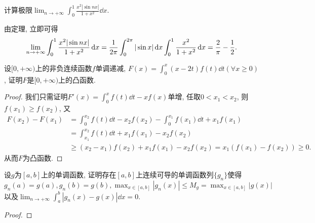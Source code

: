 \begin{quiza}
\woe 计算极限\(\lim_{n\rightarrow +\infty}\int_{0}^{1}\frac{x^2|\sin nx|}{1+x^2}\dd x.\)
\begin{solution}
由定理, 立即可得\[\lim_{n\rightarrow +\infty}\int_{0}^{1}\frac{x^2|\sin nx|}{1+x^2}\,\mathrm{d} x=\frac{1}{2\pi}\int_{0}^{2\pi}|\sin x|\,\mathrm{d} x\int_{0}^{1}\frac{x^2}{1+x^2}\,\mathrm{d} x=\frac{2}{\pi}-\frac{1}{2}.\qedhere\]
\end{solution}
\woe 设\([0,+\infty)\)上的非负连续函数\(f\)单调递减, \(F(x)=\int_{0}^{x}(x-2t)f(t)\dd t(\forall x\geqslant 0)\), 证明\(F\)是\([0,+\infty)\)上的凸函数.
\begin{proof}
我们只需证明\(F'(x)=\int_{0}^{x}f(t)\dd t-xf(x)\)单增, 任取\(0<x_1<x_2\), 则\(f(x_1)\geqslant f(x_2)\), 又\[\begin{split}
F(x_2)-F(x_1)&=\int_{0}^{x_2}f(t)\dd t-x_2f(x_2)-\int_{0}^{x_1}f(x_1)\dd t+x_1f(x_1)\\&=\int_{x_1}^{x_2}f(t)\dd t+x_1f(x_1)-x_2f(x_2)\\&\geqslant (x_2-x_1)f(x_2)+x_1f(x_1)-x_2f(x_2)=x_1\left(f(x_1)-f(x_2)\right)\geqslant 0.
\end{split}\]从而\(F\)为凸函数.
\end{proof}
\woe 设\(g\)为\([a,b]\)上的单调函数, 证明存在\([a,b]\)上连续可导的单调函数列\(\{g_n\}\)使得\(g_n(a)=g(a),g_n(b)=g(b),\max_{x\in [a,b]}|g_n(x)|\leqslant M_g=\max_{x\in [a,b]}|g(x)|\)以及\(\lim_{n\rightarrow+\infty}\int_{a}^{b}|g_n(x)-g(x)|\dd x=0.\)
\begin{proof}


\end{proof}
\end{quiza}
